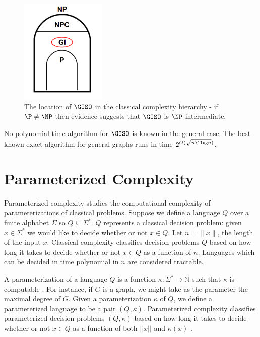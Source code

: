 \documentclass[11pt]{report}
\begin{document}
\begin{figure}[h]
\begin{center}
\leavevmode
\includegraphics[height=50mm]{GI_P_NP_v0.png}
\end{center}
\caption{The location of $\GISO$ in the classical complexity hierarchy - if $\P \neq \NP$ then evidence suggests that $\GISO$ is $\NP$-intermediate.}
\label{fig:two}
\end{figure}


No polynomial time algorithm for $\GISO$ is known in the general case. The best known exact algorithm for general graphs runs in time $2^{O(\sqrt{n\llog n})}$\cite{BabaiLuks83}. 


\section{Parameterized Complexity}


Parameterized complexity studies the computational complexity of parameterizations of classical problems. Suppose we define a language $Q$ over a finite alphabet $\Sigma$ so $Q \subseteq \Sigma ^*$. $Q$ represents a classical decision problem: given $x\in \Sigma ^*$ we would like to decide whether or not $x \in Q$. Let $n=\| x \|$, the length of the input $x$. Classical complexity classifies decision problems $Q$ based on how long it takes to decide whether or not $x \in Q$ as a function of $n$. Languages which can be decided in time polynomial in $n$ are considered tractable. 
 
A parameterization of a language $Q$ is a function $\kappa : \Sigma ^* \rightarrow \mathbb{N} $ such that $\kappa$ is computable \cite{FlumGrohe}. For instance, if $G$ is a graph, we might take as the parameter the maximal degree of $G$. Given a parameterization  $\kappa$ of $Q$, we define a parameterized language to be a pair $(Q,\kappa)$. Parameterized complexity classifies parameterized decision problems  $(Q,\kappa)$ based on how long it takes to decide whether or not $x \in Q$ as a function of both $||x||$ and $\kappa(x)$ \cite{FlumGrohe}.
\end{document}
